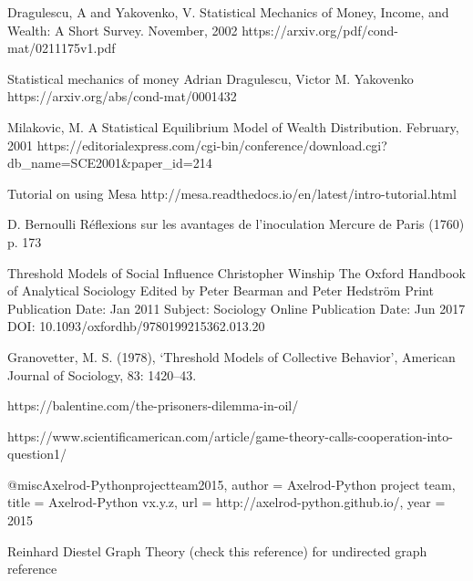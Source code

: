 \begin{thebibliography}{9}
	 Dragulescu, A and Yakovenko, V. Statistical Mechanics of Money, Income, and Wealth: A Short Survey. November, 2002 https://arxiv.org/pdf/cond-mat/0211175v1.pdf
	
	Statistical mechanics of money
	Adrian Dragulescu, Victor M. Yakovenko
	https://arxiv.org/abs/cond-mat/0001432
	
	 Milakovic, M. A Statistical Equilibrium Model of Wealth Distribution. February, 2001 https://editorialexpress.com/cgi-bin/conference/download.cgi?db\_name=SCE2001\&paper\_id=214
	
	 Tutorial on using Mesa http://mesa.readthedocs.io/en/latest/intro-tutorial.html
	
	D. Bernoulli
	Réflexions sur les avantages de l’inoculation
	Mercure de Paris (1760)
	p. 173
	
	Threshold Models of Social Influence
	Christopher Winship
	The Oxford Handbook of Analytical Sociology
	Edited by Peter Bearman and Peter Hedström
	Print Publication Date:
	Jan 2011
	Subject:
	Sociology
	Online Publication Date:
	Jun 2017
	DOI:
	10.1093/oxfordhb/9780199215362.013.20
	
	Granovetter, M. S. (1978), ‘Threshold Models of Collective Behavior’, American Journal of Sociology, 83: 1420–43.
	
	 https://balentine.com/the-prisoners-dilemma-in-oil/
	
	 https://www.scientificamerican.com/article/game-theory-calls-cooperation-into-question1/
	
	
	@misc{Axelrod-Pythonprojectteam2015,
		author = {Axelrod-Python project team},
		title = {{Axelrod-Python vx.y.z}},
		url = {http://axelrod-python.github.io/},
		year = {2015}
	}

	Reinhard Diestel Graph Theory (check this reference) for undirected graph reference
	
\end{thebibliography}